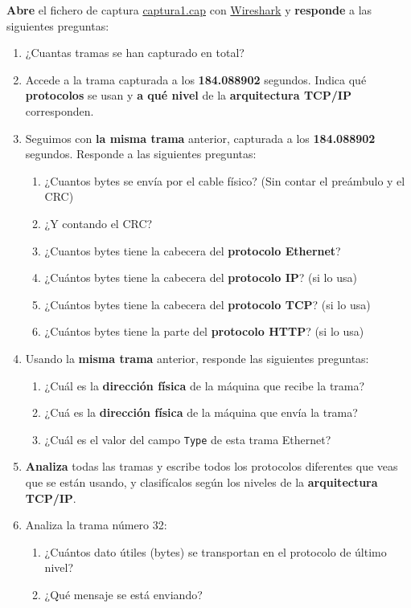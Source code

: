 \documentclass[a4paper]{article}
\begin{document}
\textbf{Abre} el fichero de captura \href{file://captura1.cap}{captura1.cap} con \href{https://www.wireshark.org/}{Wireshark} y \textbf{responde} a las siguientes preguntas:

\begin{enumerate}
	\item ¿Cuantas tramas se han capturado en total?
	
	\item Accede a la trama capturada a los \textbf{184.088902} segundos. Indica qué 
	\textbf{protocolos} se usan y \textbf{a qué nivel} de la \textbf{arquitectura TCP/IP} corresponden.
	
	\item Seguimos con \textbf{la misma trama} anterior, capturada a los \textbf{184.088902} segundos. Responde a las siguientes preguntas:
	
	\begin{enumerate}[label*=\arabic*.]
		\item ¿Cuantos bytes se envía por el cable físico? (Sin contar el preámbulo y el CRC)    
		\item ¿Y contando el CRC?    
		\item ¿Cuantos bytes tiene la cabecera del \textbf{protocolo Ethernet}?    
		\item ¿Cuántos bytes tiene la cabecera del \textbf{protocolo IP}? (si lo usa)  
		\item ¿Cuántos bytes tiene la cabecera del \textbf{protocolo TCP}? (si lo usa)  
		\item ¿Cuántos bytes tiene la parte del \textbf{protocolo HTTP}? (si lo usa)  
	\end{enumerate}

	\item Usando la \textbf{misma trama} anterior, responde las siguientes preguntas:
	
	\begin{enumerate}[label*=\arabic*.]
		\item ¿Cuál es la \textbf{dirección física} de la máquina que recibe la trama?  
		\item ¿Cuá es la \textbf{dirección física} de la máquina que envía la trama?  
		\item ¿Cuál es el valor del campo \texttt{Type} de esta trama Ethernet?
	\end{enumerate}

    \item \textbf{Analiza} todas las tramas y escribe todos los protocolos diferentes 
    que veas que se están usando, y clasifícalos según los niveles de la 
    \textbf{arquitectura TCP/IP}.
    
    \item Analiza la trama número 32:
    
    \begin{enumerate}[label*=\arabic*.]
    	\item ¿Cuántos dato útiles (bytes) se transportan en el protocolo de último nivel?  
    	\item ¿Qué mensaje se está enviando? 
    \end{enumerate}
    
	
\end{enumerate}
\end{document}
